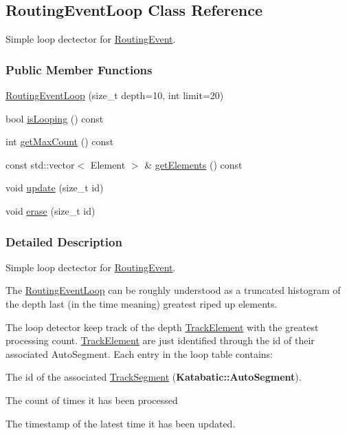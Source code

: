\hypertarget{classKite_1_1RoutingEventLoop}{\subsection{Routing\-Event\-Loop Class Reference}
\label{classKite_1_1RoutingEventLoop}
}


Simple loop dectector for \hyperlink{classKite_1_1RoutingEvent}{Routing\-Event}.  


\subsubsection*{Public Member Functions}
\begin{DoxyCompactItemize}
\item 
\hyperlink{classKite_1_1RoutingEventLoop_aa33efa06ccc2175e35eff7ac6dadffb6}{Routing\-Event\-Loop} (size\-\_\-t depth=10, int limit=20)
\item 
bool \hyperlink{classKite_1_1RoutingEventLoop_aad73ed3e38029feb236cae2527cb5f4e}{is\-Looping} () const 
\item 
int \hyperlink{classKite_1_1RoutingEventLoop_a62ba5a4c63978e4c8c71fdf0205700a5}{get\-Max\-Count} () const 
\item 
const std\-::vector$<$ Element $>$ \& \hyperlink{classKite_1_1RoutingEventLoop_a110c8ec6ec51ce13950962d1d79051fc}{get\-Elements} () const 
\item 
void \hyperlink{classKite_1_1RoutingEventLoop_ad684b7c05480897bdbd86a5fb8363c72}{update} (size\-\_\-t id)
\item 
void \hyperlink{classKite_1_1RoutingEventLoop_a9b6582ce996327c65bf532396ca11b61}{erase} (size\-\_\-t id)
\end{DoxyCompactItemize}


\subsubsection{Detailed Description}
Simple loop dectector for \hyperlink{classKite_1_1RoutingEvent}{Routing\-Event}. 

The \hyperlink{classKite_1_1RoutingEventLoop}{Routing\-Event\-Loop} can be roughly understood as a truncated histogram of the {\ttfamily depth} last (in the time meaning) greatest riped up elements.

The loop detector keep track of the {\ttfamily depth} \hyperlink{classKite_1_1TrackElement}{Track\-Element} with the greatest processing count. \hyperlink{classKite_1_1TrackElement}{Track\-Element} are just identified through the {\ttfamily id} of their associated Auto\-Segment. Each entry in the loop table contains\-:
\begin{DoxyItemize}
\item The {\ttfamily id} of the associated \hyperlink{classKite_1_1TrackSegment}{Track\-Segment} ({\bf Katabatic\-::\-Auto\-Segment}).
\item The {\ttfamily count} of times it has been processed
\item The {\ttfamily timestamp} of the latest time it has been updated.
\end{DoxyItemize}

